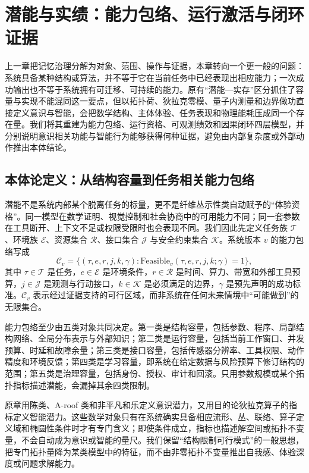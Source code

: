 \chapter{潜能与实绩：能力包络、运行激活与闭环证据}
\label{chp:duality_potentiality_actuality}
上一章把记忆治理分解为对象、范围、操作与证据，本章转向一个更一般的问题：系统具备某种结构或算法，并不等于它在当前任务中已经表现出相应能力；一次成功输出也不等于系统拥有可迁移、可持续的能力。原有“潜能—实存”区分抓住了容量与实现不能混同这一要点，但以拓扑荷、狄拉克零模、量子内测量和边界做功直接定义意识与智能，会把数学结构、主体体验、任务表现和物理能耗压成同一个存在量。我们将其重建为能力包络、运行资格、可观测绩效和因果闭环四层模型，并分别说明意识相关功能与智能行为能够获得何种证据，避免由内部复杂度或外部动作推出本体结论。

\section{本体论定义：从结构容量到任务相关能力包络}
\label{sec:section_9823}
潜能不是系统内部某个脱离任务的标量，更不是纤维丛示性类自动赋予的“体验资格”。同一模型在数学证明、视觉控制和社会协商中的可用能力不同；同一套参数在工具断开、上下文不足或权限受限时也会表现不同。我们因此先定义任务族 $\mathcal T$、环境族 $\mathcal E$、资源集合 $\mathcal R$、接口集合 $\mathcal J$ 与安全约束集合 $\mathcal K$。系统版本 $v$ 的能力包络写成
\[
\mathcal C_v=
\{(\tau,e,r,j,k,\gamma):
\mathrm{Feasible}_v(\tau,e,r,j,k;\gamma)=1\},
\]
其中 $\tau\in\mathcal T$ 是任务，$e\in\mathcal E$ 是环境条件，$r\in\mathcal R$ 是时间、算力、带宽和外部工具预算，$j\in\mathcal J$ 是观测与行动接口，$k\in\mathcal K$ 是必须满足的边界，$\gamma$ 是预先声明的成功标准。$\mathcal C_v$ 表示经过证据支持的可行区域，而非系统在任何未来情境中“可能做到”的无限集合。

能力包络至少由五类对象共同决定。第一类是结构容量，包括参数、程序、局部结构网络、全局分布表示与外部知识；第二类是运行容量，包括当前工作窗口、并发预算、时延和故障余量；第三类是接口容量，包括传感器分辨率、工具权限、动作精度和环境反馈；第四类是学习容量，即系统在给定数据与风险预算下修订结构的范围；第五类是治理容量，包括身份、授权、审计和回滚。只用参数规模或某个拓扑指标描述潜能，会漏掉其余四类限制。

原章用陈类、A-roof 类和非平凡和乐定义意识潜力，又用目的论狄拉克算子的指标定义智能潜力。这些数学对象只有在系统确实具备相应流形、丛、联络、算子定义域和椭圆性条件时才有专门含义；即使条件成立，指标也描述解空间或拓扑不变量，不会自动成为意识或智能的量尺。我们保留“结构限制可行模式”的一般思想，把专门拓扑量降为某类模型中的特征，而不由非零拓扑不变量推出自我感、体验深度或问题求解能力。

